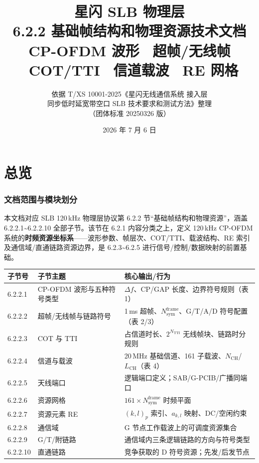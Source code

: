 \documentclass[11pt,a4paper]{ctexart}
\title{%
  \textbf{星闪 SLB 物理层}\\[0.4em]
  \Large 6.2.2 基础帧结构和物理资源技术文档\\[0.3em]
  \large CP-OFDM 波形 \textbullet\ 超帧/无线帧 \textbullet\ COT/TTI \textbullet\ 信道载波 \textbullet\ RE 网格
}
\author{依据 T/XS 10001-2025《星闪无线通信系统 接入层\\
同步低时延宽带空口 SLB 技术要求和测试方法》整理\\
（团体标准 20250326 版）}
\date{2026 年 7 月 6 日}
\begin{document}
\maketitle
\tableofcontents
\newpage

\part{总览}

\section{文档范围与模块划分}

本文档对应 SLB 120\,kHz 物理层协议第 6.2.2 节``基础帧结构和物理资源''，涵盖 6.2.2.1\textasciitilde 6.2.2.10 全部子节。该节在 6.2.1 内容分类之上，定义 120\,kHz CP-OFDM 系统的\textbf{时频资源坐标系}——波形参数、帧层次、COT/TTI、载波结构、RE 索引及通信域/直通链路资源边界，是 6.2.3\textasciitilde 6.2.5 进行信号/控制/数据映射的前置基础。

\begin{table}[h]
\centering
\small
\begin{tabular}{L{2.2cm}L{4.8cm}L{6.5cm}}
\toprule
\textbf{子节号} & \textbf{子节主题} & \textbf{核心输出/行为} \\
.2.1 & CP-OFDM 波形与五种符号类型 & $\Delta f$、CP/GAP 长度、边界符号规则（表 1） \\
6.2.2.2 & 超帧/无线帧与链路符号 & 1\,ms 超帧、$N_{\mathrm{sym}}^{\mathrm{frame}}$、G/T/A/D 符号配置（表 2/3） \\
6.2.2.3 & COT 与 TTI & 占信道时长、$2^{N_{\mathrm{TTI}}}$ 无线帧块、链路时分规则 \\
6.2.2.4 & 信道与载波 & 20\,MHz 基础信道、161 子载波、$N_{\mathrm{CH}}$/$L_{\mathrm{CH}}$（表 4） \\
6.2.2.5 & 天线端口 & 逻辑端口定义；SAB/G-PCIB/广播同端口 \\
6.2.2.6 & 资源网格 & $161 \times N_{\mathrm{sym}}^{\mathrm{frame}}$ 时频平面 \\
6.2.2.7 & 资源元素 RE & $(k,l)_p$ 索引、$a_{k,l}$ 映射、DC/空闲约束 \\
6.2.2.8 & 通信域 & G 节点工作载波上的可调度资源集合 \\
6.2.2.9 & G/T/附链路 & 通信域内三条逻辑链路的方向与符号类型 \\
6.2.2.10 & 直通链路 & 竞争获取的 D 符号资源；先发/后发节点 \\
\bottomrule
\end{tabular}
\end{table}
\end{document}
